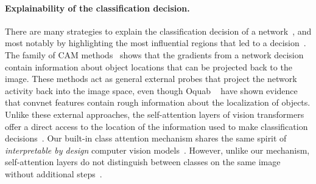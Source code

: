 %




\paragraph{Explainability of the classification decision.} 
%
There are many strategies to explain the classification decision of a network~\cite{ribeiro2016lime, zeiler2014visualizing}, and most notably by highlighting the most influential regions that led to a decision~\cite{simonyan2014deep, Zhou2016LearningDF,fong2017perturbation}.  
The family of CAM methods~\cite{Wang2020ScoreCAMSV,Chattopadhyay2018GradCAMGG,Selvaraju2019GradCAMVE,Zhou2016LearningDF} shows that the gradients from a network decision contain information about object locations that can be projected back to the image. 
%
These methods act as general external probes that project the network activity back into the image space, even though Oquab \etal~\cite{oquab2015object} have shown evidence that convnet features contain rough information about the localization of objects.
Unlike these external approaches, the self-attention layers of vision transformers offer a direct access to the location of the information used to make classification decisions~\cite{dosovitskiy2020image, Touvron2020TrainingDI,touvron2021going,caron2021emerging}. 
Our built-in class attention mechanism shares the same spirit of \emph{interpretable by design} computer vision models~\cite{rudin2019nature}. 
However, unlike our mechanism, self-attention layers do not distinguish between classes on the same image without additional steps~\cite{Chefer2021TransformerIB}.

%